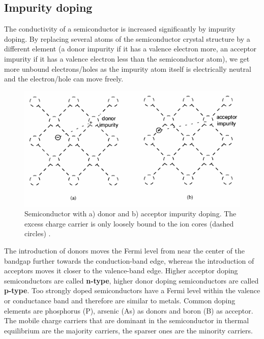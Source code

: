 \documentclass[main]{subfiles}
\begin{document}
\subsection{Impurity doping}

The conductivity of a semiconductor is increased significantly by impurity doping. By replacing several atoms of the semiconductor crystal structure by a different element (a donor impurity if it has a valence electron more, an acceptor impurity if it has a valence electron less than the semiconductor atom), we get more unbound electrons/holes as the impurity atom itself is electrically neutral and the electron/hole can move freely.

\begin{figure}[H]
\centering
\includegraphics[scale=0.4]{figs/impurity_doping.png}
\caption{Semiconductor with a) donor and b) acceptor impurity doping. The excess charge carrier is only loosely bound to the ion cores (dashed circles) \cite{book:VLSI}.}
\end{figure}

The introduction of donors moves the Fermi level from near the center of the bandgap further towards the conduction-band edge, whereas the
introduction of acceptors moves it closer to the valence-band edge. Higher acceptor doping semiconductors are called \textbf{n-type}, higher donor doping semiconductors are called \textbf{p-type}. Too strongly doped semiconductors have a Fermi level within the valence or conductance band and therefore are similar to metals. Common doping elements are phosphorus (P), arsenic (As) as donors and boron (B) as acceptor.\\
The mobile charge carriers that are dominant in the semiconductor in thermal equilibrium are the majority carriers, the sparser ones are the minority carriers.
\end{document}
